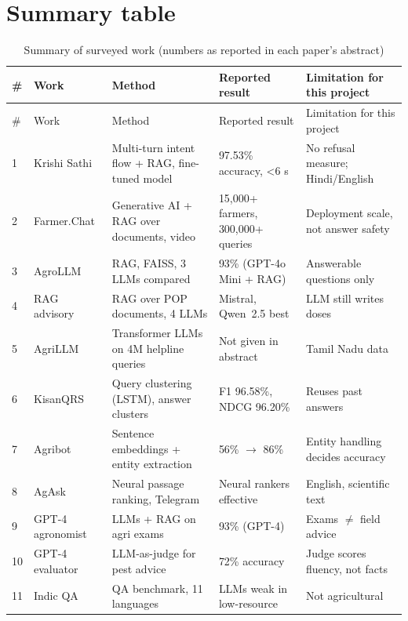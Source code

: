 \section{Summary table}
\begin{small}
\begin{longtable}{p{0.4cm}p{3.0cm}p{3.6cm}p{3.2cm}p{3.6cm}}
\caption{Summary of surveyed work (numbers as reported in each paper's abstract)}\label{tab:lit}\\
\toprule
\# & Work & Method & Reported result & Limitation for this project\\
\midrule
\endfirsthead
\toprule
\# & Work & Method & Reported result & Limitation for this project\\
\midrule
\endhead
1 & Krishi Sathi \cite{vijayvargia2025krishisathi} & Multi-turn intent flow + RAG, fine-tuned model & 97.53\% accuracy, <6 s & No refusal measure; Hindi/English\\
2 & Farmer.Chat \cite{singh2024farmerchat} & Generative AI + RAG over documents, video & 15,000+ farmers, 300,000+ queries & Deployment scale, not answer safety\\
3 & AgroLLM \cite{samuel2025agrollm} & RAG, FAISS, 3 LLMs compared & 93\% (GPT-4o Mini + RAG) & Answerable questions only\\
4 & RAG advisory \cite{sawant2026empowering} & RAG over POP documents, 4 LLMs & Mistral, Qwen~2.5 best & LLM still writes doses\\
5 & AgriLLM \cite{didwania2024agrillm} & Transformer LLMs on 4M helpline queries & Not given in abstract & Tamil Nadu data\\
6 & KisanQRS \cite{rehman2024kisanqrs} & Query clustering (LSTM), answer clusters & F1 96.58\%, NDCG 96.20\% & Reuses past answers\\
7 & Agribot \cite{jain2025agribot} & Sentence embeddings + entity extraction & 56\% $\rightarrow$ 86\% & Entity handling decides accuracy\\
8 & AgAsk \cite{koopman2022agask} & Neural passage ranking, Telegram & Neural rankers effective & English, scientific text\\
9 & GPT-4 agronomist \cite{silva2023gpt4agronomist} & LLMs + RAG on agri exams & 93\% (GPT-4) & Exams $\neq$ field advice\\
10 & GPT-4 evaluator \cite{yang2024gpt4evaluator} & LLM-as-judge for pest advice & 72\% accuracy & Judge scores fluency, not facts\\
11 & Indic QA \cite{singh2024indicqa} & QA benchmark, 11 languages & LLMs weak in low-resource & Not agricultural\\

\end{longtable}
\end{small}
